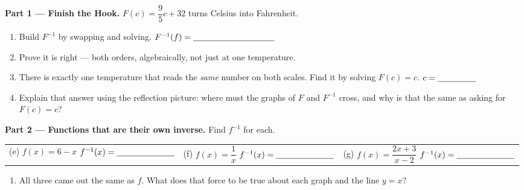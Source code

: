 \documentclass[10pt]{article}
\begin{document}
\begin{tcolorbox}[colback=white, colframe=black!40, title=\textbf{Tier E --- Extension},
    fonttitle=\bfseries, arc=1.5mm, left=3mm, right=3mm, top=2mm, bottom=2mm, breakable]
\textbf{Part 1 --- Finish the Hook.} $F(c)=\dfrac{9}{5}c+32$ turns Celsius into Fahrenheit.
\begin{enumerate}[label=(\alph*), leftmargin=1.9em, itemsep=6pt]
  \item Build $F^{-1}$ by swapping and solving. \; $F^{-1}(f)=\blank{3.4cm}$
        \vspace{0.35in}
  \item Prove it is right --- both orders, algebraically, not just at one temperature.
  \item There is exactly one temperature that reads the \emph{same} number on both scales. Find it
        by solving $F(c)=c$. \; $c=\blank{1.6cm}$
        \vspace{0.35in}
  \item Explain that answer using the reflection picture: where must the graphs of $F$ and $F^{-1}$
        cross, and why is that the same as asking for $F(c)=c$? 
\end{enumerate}

\vspace{4pt}
\textbf{Part 2 --- Functions that are their own inverse.} Find $f^{-1}$ for each.
\begin{center}
\renewcommand{\arraystretch}{1.8}
\begin{tabularx}{\linewidth}{@{}X X X@{}}
(e) \; $f(x)=6-x$ \; $f^{-1}(x)=\blank{2.4cm}$ &
(f) \; $f(x)=\dfrac{1}{x}$ \; $f^{-1}(x)=\blank{2.4cm}$ &
(g) \; $f(x)=\dfrac{2x+3}{x-2}$ \; $f^{-1}(x)=\blank{2.4cm}$ \\
\end{tabularx}
\end{center}
\vspace{0.55in}
\begin{enumerate}[label=(\alph*), leftmargin=1.9em, itemsep=5pt, start=8]
  \item All three came out the same as $f$. What does that force to be true about each graph and the
        line $y=x$? 
\end{enumerate}


\end{tcolorbox}
\end{document}
